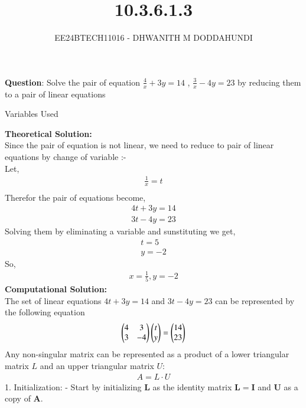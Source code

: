 \documentclass[journal]{IEEEtran}
\begin{document}

\vspace{3cm}

\title{10.3.6.1.3}
\author{EE24BTECH11016 - DHWANITH M DODDAHUNDI}
{\let\newpage\relax\maketitle}

\renewcommand{\thefigure}{\theenumi}
\renewcommand{\thetable}{\theenumi}
\setlength{\intextsep}{10pt} %


\renewcommand{\thetable}{\theenumi}


\textbf{Question}:\newline
Solve the pair of equation $\frac{4}{x}+3y=14 $ , $\frac{3}{x}-4y=23$ by reducing them to a pair of linear equations 
\newline
\begin{table}[h!]    
  \centering
  
  \caption{Variables Used}
  \label{tab1.1.2.2}
\end{table}
\newline
\textbf{Theoretical Solution:}\\
Since the pair of equation is not linear, we need to reduce to pair of linear equations by change of variable :-\\
Let, \\
\begin{align}
    \frac{1}{x}=t \\
\end{align}
Therefor the pair of equations become,\\
\begin{align}
    4t+3y=14 \\
    3t-4y=23
\end{align}
Solving them by eliminating a variable and sunstituting we get,
\begin{align}
    t=5 \\
    y=-2
\end{align}
So,
\begin{align}
    x=\frac{1}{5},y=-2
\end{align}
\textbf{Computational Solution:}\\
The set of linear equations $4t+3y=14$ and $3t-4y=23$ can be represented by the following equation
\begin{align}
    \begin{pmatrix}4&3\\3&-4\end{pmatrix}\begin{pmatrix}t\\y\end{pmatrix}=\begin{pmatrix}14\\23\end{pmatrix}
\end{align}
Any non-singular matrix can be represented as a product of a lower triangular matrix $L$ and an
upper triangular matrix $U$:
\begin{align}
    A = L \cdot U
\end{align}
1. Initialization: 
   - Start by initializing $ \mathbf{L} $ as the identity matrix $ \mathbf{L} = \mathbf{I} $ and $ \mathbf{U} $ as a copy of $ \mathbf{A} $.
   
\end{document}
